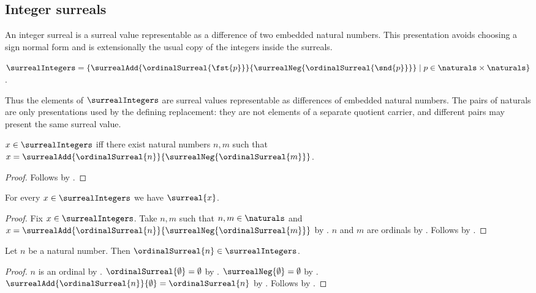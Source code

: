 \subsection{Integer surreals}

An integer surreal is a surreal value representable as a difference of two
embedded natural numbers.  This presentation avoids choosing a sign normal
form and is extensionally the usual copy of the integers inside the surreals.

\begin{definition}\label{surreal_integers}
    $\surrealIntegers=
        \{\surrealAdd
            {\ordinalSurreal{\fst{p}}}
            {\surrealNeg{\ordinalSurreal{\snd{p}}}}
            \mid p\in\naturals\times\naturals\}$.
\end{definition}

Thus the elements of $\surrealIntegers$ are surreal values representable as
differences of embedded natural numbers.  The pairs of naturals are only
presentations used by the defining replacement: they are not elements of a
separate quotient carrier, and different pairs may present the same surreal
value.

\begin{proposition}\label{surreal_integer_iff}
    $x\in\surrealIntegers$ iff there exist natural numbers $n,m$ such that
        $x=\surrealAdd{\ordinalSurreal{n}}
            {\surrealNeg{\ordinalSurreal{m}}}$.
\end{proposition}
\begin{proof}
    Follows by .
\end{proof}

\begin{proposition}\label{surreal_integer_is_surreal}
    For every $x\in\surrealIntegers$ we have $\surreal{x}$.
\end{proposition}
\begin{proof}
    Fix $x\in\surrealIntegers$.
    Take $n,m$ such that $n,m\in\naturals$ and
        $x=\surrealAdd{\ordinalSurreal{n}}
            {\surrealNeg{\ordinalSurreal{m}}}$
        by .
    $n$ and $m$ are ordinals by .
    Follows by .
\end{proof}

\begin{proposition}\label{natural_surreal_is_integer}
    Let $n$ be a natural number.
    Then $\ordinalSurreal{n}\in\surrealIntegers$.
\end{proposition}
\begin{proof}
    $n$ is an ordinal by .
    $\ordinalSurreal{\emptyset}=\emptyset$
        by .
    $\surrealNeg{\emptyset}=\emptyset$
        by .
    $\surrealAdd{\ordinalSurreal{n}}{\emptyset}
        =\ordinalSurreal{n}$
        by .
    Follows by .
\end{proof}

